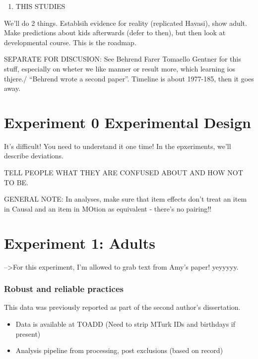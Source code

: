 \documentclass[english,man]{apa6}
\providecommand{\tightlist}{%
  \setlength{\itemsep}{0pt}\setlength{\parskip}{0pt}}
\newcounter{author}
\theoremstyle{definition}
\theoremstyle{definition}
\theoremstyle{remark}
\begin{document}
\begin{enumerate}
\def\labelenumi{\Roman{enumi}.}
\setcounter{enumi}{3}
\tightlist
\item
  THIS STUDIES
\end{enumerate}

We'll do 2 things. Establsih evidence for reality (replicated Havasi),
show adult. Make predictions about kids afterwards (defer to then), but
then look at developmental course. This is the roadmap.

SEPARATE FOR DISCUSION: See Behrend Farer Tomaello Gentner for this
stuff, especially on wheter we like manner or result more, which
learning ios thjere./ \enquote{Behrend wrote a second paper}. Timeline
is about 1977-185, then it goes away.

\section{Experiment 0 Experimental
Design}\label{experiment-0-experimental-design}

It's difficult! You need to understand it one time! In the epxeriments,
we'll describe deviations.

TELL PEOPLE WHAT THEY ARE CONFUSED ABOUT AND HOW NOT TO BE.

GENERAL NOTE: In analyses, make sure that item effects don't treat an
item in Causal and an item in MOtion as equivalent - there's no
pairing!!

\section{Experiment 1: Adults}\label{experiment-1-adults}

--\textgreater{}For this experiment, I'm allowed to grab text from Amy's
paper! yeyyyyy.

\subsubsection{Robust and reliable
practices}\label{robust-and-reliable-practices}

This data was previously reported as part of the second author's
dissertation.

\begin{itemize}
\tightlist
\item
  Data is available at TOADD (Need to strip MTurk IDs and birthdays if
  present)
\item
  Analysis pipeline from processing, post exclusions (based on record)
\end{itemize}
\end{document}
